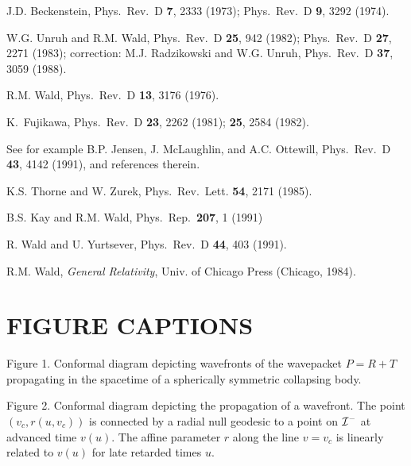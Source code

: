 \documentclass[12pt]{article}
\def\pastI{{\cal I}^-}
\begin{document}
\begin{thebibliography}{99}
J.D. Beckenstein, Phys.\ Rev.\ D {\bf 7}, 2333 (1973);
Phys.\ Rev.\ D {\bf 9}, 3292 (1974).

W.G. Unruh and R.M. Wald, Phys.\ Rev.\ D {\bf 25},
942 (1982); Phys.\ Rev.\ D {\bf 27}, 2271 (1983);
correction: M.J. Radzikowski
and W.G. Unruh, Phys.\ Rev.\ D {\bf 37}, 3059 (1988).

R.M. Wald, Phys.\ Rev.\ D {\bf 13}, 3176 (1976).

K.\ Fujikawa, Phys.\ Rev.\ D {\bf 23},
2262 (1981); {\bf 25}, 2584 (1982).

See for example B.P. Jensen, J. McLaughlin, and
A.C. Ottewill, Phys.\ Rev.\ D {\bf 43}, 4142 (1991), and references
therein.

K.S. Thorne and W. Zurek, Phys.\ Rev.\ Lett.
{\bf 54}, 2171 (1985).

B.S. Kay and R.M. Wald, Phys.\ Rep.\ {\bf 207}, 1 (1991)

R. Wald and U. Yurtsever, Phys.\ Rev.\ D {\bf 44},
403 (1991).

R.M. Wald, {\it General Relativity},
Univ. of Chicago Press (Chicago, 1984).

\end{thebibliography}

\section*{FIGURE CAPTIONS}

\noindent Figure 1. Conformal diagram depicting wavefronts of the
wavepacket $P=R+T$ propagating in the spacetime of a
spherically symmetric collapsing body.
\vspace{1cm}

\noindent Figure 2. Conformal diagram depicting the propagation of a wavefront.
The point $(v_c, r(u,v_c))$ is connected by a radial null geodesic
to a point on $\pastI$ at advanced time $v(u)$. The affine parameter
$r$ along the line $v=v_c$ is linearly related to $v(u)$ for late
retarded times $u$.
\end{document}
